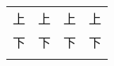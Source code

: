 \setlength\dashlinedash{1pt}
\setlength\dashlinegap{2pt}
\begin{tabular}{:cc:cc:}
\hdashline
上 & 上 & 上 & 上 \\
下 & 下 & 下 & 下 \\
\hdashline
\end{tabular}
